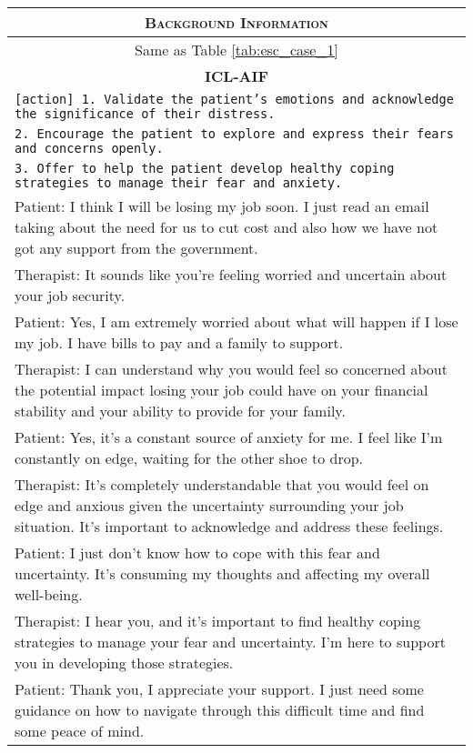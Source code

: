 \begin{table}[]
    \centering
    \begin{tabular}{p{13.5cm}}
    \toprule
    \multicolumn{1}{c}{\textsc{\textbf{Background Information}}}\\
    \midrule
    \multicolumn{1}{c}{Same as Table \ref{tab:esc_case_1}}\\
    \midrule
    \midrule
    \multicolumn{1}{c}{\textsc{\textbf{ICL-AIF}}}\\
    \midrule
    \texttt{[action] 1. Validate the patient's emotions and acknowledge the significance of their distress.}\\
    \texttt{2. Encourage the patient to explore and express their fears and concerns openly.}\\
    \texttt{3. Offer to help the patient develop healthy coping strategies to manage their fear and anxiety.}\\
    Patient: I think I will be losing my job soon. I just read an email taking about the need for us to cut cost and also how we have not got any support from the government.\\
    Therapist: It sounds like you're feeling worried and uncertain about your job security.\\
    Patient: Yes, I am extremely worried about what will happen if I lose my job. I have bills to pay and a family to support.\\
    Therapist: I can understand why you would feel so concerned about the potential impact losing your job could have on your financial stability and your ability to provide for your family.\\
    Patient: Yes, it's a constant source of anxiety for me. I feel like I'm constantly on edge, waiting for the other shoe to drop.\\
    Therapist: It's completely understandable that you would feel on edge and anxious given the uncertainty surrounding your job situation. It's important to acknowledge and address these feelings.\\
    Patient: I just don't know how to cope with this fear and uncertainty. It's consuming my thoughts and affecting my overall well-being.\\
    Therapist: I hear you, and it's important to find healthy coping strategies to manage your fear and uncertainty. I'm here to support you in developing those strategies.\\
    Patient: Thank you, I appreciate your support. I just need some guidance on how to navigate through this difficult time and find some peace of mind.\\

\end{tabular}
\end{table}
